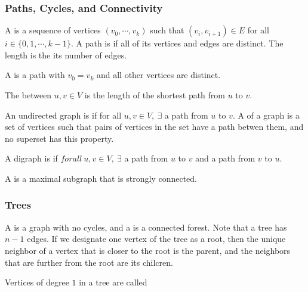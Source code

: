 \documentclass[12pt]{scrartcl}
\begin{document}
\subsubsection{Paths, Cycles, and Connectivity}

\begin{definition}
  A  is a sequence of vertices $(v_0, \cdots, v_k)$ such that 
  $(v_i, v_{i+1}) \in E$ for all $i \in \{0, 1, \cdots, k-1\}$. 
  A path is  if all of its vertices and edges are distinct. The length is the its number 
  of edges.
\end{definition}

\begin{definition}
  A  is a path with $v_0 = v_k$ and all other vertices are distinct. 
\end{definition}

\begin{definition}
  The  between $u, v \in V$ is the length of the shortest path from $u$ to $v$. 
\end{definition}

\begin{definition}
  An undirected graph is  if for all $u, v \in V, \ \exists$ a path from $u$ to $v$. A 
   of a graph is a set of vertices such that pairs of vertices in the set 
  have a path betwen them, and no superset has this property. 
\end{definition}

\begin{definition}
  A digraph is  if $forall \ u, v \in V, \ \exists$ a path from $u$ to $v$ and a 
  path from $v$ to $u$.
\end{definition}

\begin{definition}
  A  is a maximal subgraph that is strongly connected. 
\end{definition}

\subsubsection{Trees}

\begin{definition}
  A  is a graph with no cycles, and a  is a connected forest. Note that 
  a  tree has $n-1$ edges. If we designate one vertex of the tree as a root, then the 
  unique neighbor of a vertex that is closer to the root is the parent, and the neighbors that 
  are further from the root are its chilcren. 

  Vertices of degree $1$ in a tree are called 
\end{definition}
\end{document}
